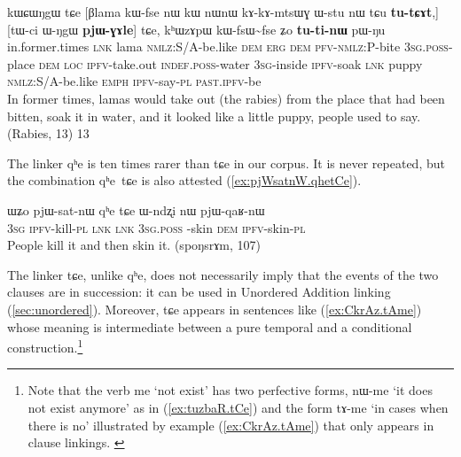 \documentclass[oldfontcommands,oneside,a4paper,11pt]{article}
\newcommand{\ipa}[1]{{\phon \mbox{#1}}} %
\newcommand{\refb}[1]{(\ref{#1})}
\begin{document}
\begin{exe}
\ex \label{ex:pWNu2}
\gll
\ipa{kɯɕɯŋgɯ}  	\ipa{tɕe}  	[\ipa{βlama}  	\ipa{kɯ-fse}  	\ipa{nɯ}  	\ipa{kɯ}  	\ipa{nɯnɯ}  	\ipa{kɤ-kɤ-mtsɯɣ}  	\ipa{ɯ-stu}  	\ipa{nɯ}  	\ipa{tɕu}  	\ipa{\textbf{tu-tɕɤt},}]  	[\ipa{tɯ-ci}  	\ipa{ɯ-ŋgɯ}  	\ipa{\textbf{pjɯ-ɣɤle}}]  	\ipa{tɕe,}  	\ipa{kʰɯzɤpɯ}  	\ipa{kɯ-fsɯ\textasciitilde{}fse}  	\ipa{ʑo}  	\textbf{\ipa{tu-ti-nɯ}}  	\ipa{pɯ-ŋu}  \\
in.former.times \textsc{lnk} lama \textsc{nmlz}:S/A-be.like \textsc{dem} \textsc{erg}  \textsc{dem} \textsc{pfv-nmlz:P}-bite \textsc{3sg.poss}-place \textsc{dem} \textsc{loc} \textsc{ipfv}-take.out \textsc{indef.poss}-water \textsc{3sg}-inside \textsc{ipfv}-soak \textsc{lnk} puppy \textsc{nmlz:S/A}-be.like \textsc{emph} \textsc{ipfv}-say-\textsc{pl} \textsc{past.ipfv}-be \\
\glt In former times, lamas would take out (the rabies) from the place that had been bitten, soak it in water, and it looked like a little puppy, people used to say. (Rabies, 13)
13
  \end{exe}  

The linker \ipa{qʰe} is ten times rarer than \ipa{tɕe} in our corpus. It is  never repeated, but the combination \ipa{qʰe tɕe} is also attested \refb{ex:pjWsatnW.qhetCe}.

\begin{exe}
\ex \label{ex:pjWsatnW.qhetCe}
\gll 
\ipa{ɯʑo}  	\ipa{pjɯ-sat-nɯ}  	\ipa{qʰe}  	\ipa{tɕe}  	\ipa{ɯ-ndʐi}  	\ipa{nɯ}  	\ipa{pjɯ-qaʁ-nɯ}  \\
\textsc{3sg} \textsc{ipfv}-kill-\textsc{pl} \textsc{lnk}  \textsc{lnk} \textsc{3sg.poss }-skin \textsc{dem} \textsc{ipfv}-skin-\textsc{pl} \\
\glt People kill it and then skin it. (\ipa{spoŋsrɤm}, 107)
\end{exe}

 The linker \ipa{tɕe}, unlike \ipa{qʰe},  does not necessarily imply that the events of the two clauses are in succession: it can be used in Unordered Addition linking \refb{sec:unordered}. Moreover,  \ipa{tɕe}  appears in sentences like \refb{ex:CkrAz.tAme} whose meaning is intermediate between a pure temporal and a conditional construction.\footnote{Note that the verb \ipa{me} `not exist' has two perfective forms,  \ipa{nɯ-me} `it does not exist anymore' as in \refb{ex:tuzbaR.tCe} and the   form \ipa{tɤ-me} `in cases when there is no' illustrated by example \refb{ex:CkrAz.tAme} that only appears in clause linkings. \label{ft:tAme}}
\end{document}
